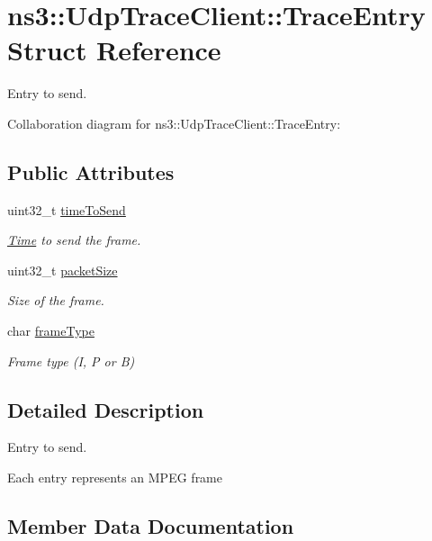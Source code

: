 \hypertarget{structns3_1_1UdpTraceClient_1_1TraceEntry}{}\section{ns3\+:\+:Udp\+Trace\+Client\+:\+:Trace\+Entry Struct Reference}
\label{structns3_1_1UdpTraceClient_1_1TraceEntry}


Entry to send.  




Collaboration diagram for ns3\+:\+:Udp\+Trace\+Client\+:\+:Trace\+Entry\+:
\subsection*{Public Attributes}
\begin{DoxyCompactItemize}
\item 
uint32\+\_\+t \hyperlink{structns3_1_1UdpTraceClient_1_1TraceEntry_a654ee957fff2e819a3b736b251b3994f}{time\+To\+Send}
\begin{DoxyCompactList}\small\item\em \hyperlink{classns3_1_1Time}{Time} to send the frame. \end{DoxyCompactList}\item 
uint32\+\_\+t \hyperlink{structns3_1_1UdpTraceClient_1_1TraceEntry_a82474d07bd39e6ee632adbe4834a1761}{packet\+Size}
\begin{DoxyCompactList}\small\item\em Size of the frame. \end{DoxyCompactList}\item 
char \hyperlink{structns3_1_1UdpTraceClient_1_1TraceEntry_ab858a6d0ee4b240ca12842c3cfebd366}{frame\+Type}
\begin{DoxyCompactList}\small\item\em Frame type (I, P or B) \end{DoxyCompactList}\end{DoxyCompactItemize}


\subsection{Detailed Description}
Entry to send. 

Each entry represents an M\+P\+EG frame 

\subsection{Member Data Documentation}

